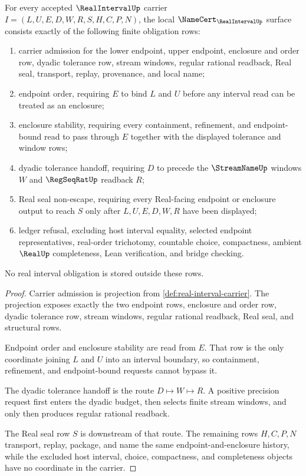 \begin{theorem}
\label{thm:real-interval-namecert-obligations}
For every accepted $\RealIntervalUp$ carrier $I=(L,U,E,D,W,R,S,H,C,P,N)$, the local $\NameCert_{\RealIntervalUp}$ surface consists exactly of the following finite obligation rows:
\begin{enumerate}
\item carrier admission for the lower endpoint, upper endpoint, enclosure and order row, dyadic tolerance row, stream windows, regular rational readback, Real seal, transport, replay, provenance, and local name;
\item endpoint order, requiring $E$ to bind $L$ and $U$ before any interval read can be treated as an enclosure;
\item enclosure stability, requiring every containment, refinement, and endpoint-bound read to pass through $E$ together with the displayed tolerance and window rows;
\item dyadic tolerance handoff, requiring $D$ to precede the $\StreamNameUp$ windows $W$ and $\RegSeqRatUp$ readback $R$;
\item Real seal non-escape, requiring every Real-facing endpoint or enclosure output to reach $S$ only after $L,U,E,D,W,R$ have been displayed;
\item ledger refusal, excluding host interval equality, selected endpoint representatives, real-order trichotomy, countable choice, compactness, ambient $\RealUp$ completeness, Lean verification, and bridge checking.
\end{enumerate}
No real interval obligation is stored outside these rows.
\end{theorem}
\begin{proof}
Carrier admission is projection from \autoref{def:real-interval-carrier}. The projection exposes exactly the two endpoint rows, enclosure and order row, dyadic tolerance row, stream windows, regular rational readback, Real seal, and structural rows.

Endpoint order and enclosure stability are read from $E$. That row is the only coordinate joining $L$ and $U$ into an interval boundary, so containment, refinement, and endpoint-bound requests cannot bypass it.

The dyadic tolerance handoff is the route $D\mapsto W\mapsto R$. A positive precision request first enters the dyadic budget, then selects finite stream windows, and only then produces regular rational readback.

The Real seal row $S$ is downstream of that route. The remaining rows $H,C,P,N$ transport, replay, package, and name the same endpoint-and-enclosure history, while the excluded host interval, choice, compactness, and completeness objects have no coordinate in the carrier.
\end{proof}


